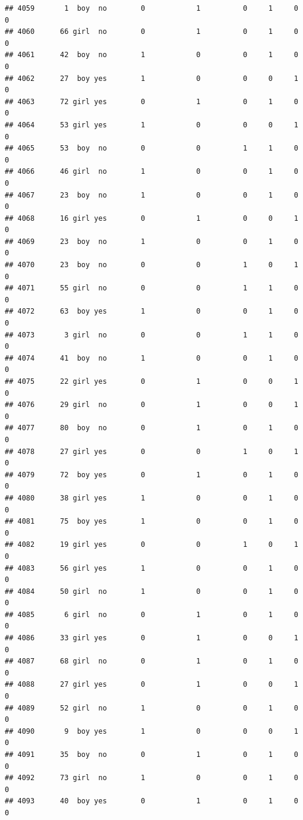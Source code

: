 \documentclass[man]{apa6}
\begin{document}
\begin{verbatim}
## 4059       1  boy  no        0            1          0     1     0     0
## 4060      66 girl  no        0            1          0     1     0     0
## 4061      42  boy  no        1            0          0     1     0     0
## 4062      27  boy yes        1            0          0     0     1     0
## 4063      72 girl yes        0            1          0     1     0     0
## 4064      53 girl yes        1            0          0     0     1     0
## 4065      53  boy  no        0            0          1     1     0     0
## 4066      46 girl  no        1            0          0     1     0     0
## 4067      23  boy  no        1            0          0     1     0     0
## 4068      16 girl yes        0            1          0     0     1     0
## 4069      23  boy  no        1            0          0     1     0     0
## 4070      23  boy  no        0            0          1     0     1     0
## 4071      55 girl  no        0            0          1     1     0     0
## 4072      63  boy yes        1            0          0     1     0     0
## 4073       3 girl  no        0            0          1     1     0     0
## 4074      41  boy  no        1            0          0     1     0     0
## 4075      22 girl yes        0            1          0     0     1     0
## 4076      29 girl  no        0            1          0     0     1     0
## 4077      80  boy  no        0            1          0     1     0     0
## 4078      27 girl yes        0            0          1     0     1     0
## 4079      72  boy yes        0            1          0     1     0     0
## 4080      38 girl yes        1            0          0     1     0     0
## 4081      75  boy yes        1            0          0     1     0     0
## 4082      19 girl yes        0            0          1     0     1     0
## 4083      56 girl yes        1            0          0     1     0     0
## 4084      50 girl  no        1            0          0     1     0     0
## 4085       6 girl  no        0            1          0     1     0     0
## 4086      33 girl yes        0            1          0     0     1     0
## 4087      68 girl  no        0            1          0     1     0     0
## 4088      27 girl yes        0            1          0     0     1     0
## 4089      52 girl  no        1            0          0     1     0     0
## 4090       9  boy yes        1            0          0     0     1     0
## 4091      35  boy  no        0            1          0     1     0     0
## 4092      73 girl  no        1            0          0     1     0     0
## 4093      40  boy yes        0            1          0     1     0     0

\end{verbatim}
\end{document}
